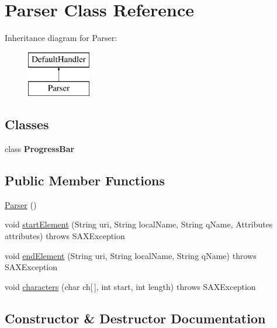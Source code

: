 \hypertarget{class_parser}{}\section{Parser Class Reference}
\label{class_parser}
Inheritance diagram for Parser\+:\begin{figure}[H]
\begin{center}
\leavevmode
\includegraphics[height=2.000000cm]{class_parser}
\end{center}
\end{figure}
\subsection*{Classes}
\begin{DoxyCompactItemize}
\item 
class {\bfseries Progress\+Bar}
\end{DoxyCompactItemize}
\subsection*{Public Member Functions}
\begin{DoxyCompactItemize}
\item 
\hyperlink{class_parser_a5b20dc7a1c7a26ce3cec6cc070839bd4}{Parser} ()
\item 
void \hyperlink{class_parser_a6ca2235d63e8d6ce30a4a7c3e2deb523}{start\+Element} (String uri, String local\+Name, String q\+Name, Attributes attributes)  throws S\+A\+X\+Exception 
\item 
void \hyperlink{class_parser_a6235e3c77c809f5012c95629345e0f2f}{end\+Element} (String uri, String local\+Name, String q\+Name)  throws S\+A\+X\+Exception 
\item 
void \hyperlink{class_parser_a47bcfb67533ee080c38771c5487edd90}{characters} (char ch\mbox{[}$\,$\mbox{]}, int start, int length)  throws S\+A\+X\+Exception 
\end{DoxyCompactItemize}


\subsection{Constructor \& Destructor Documentation}
\hypertarget{class_parser_a5b20dc7a1c7a26ce3cec6cc070839bd4}{}\label{class_parser_a5b20dc7a1c7a26ce3cec6cc070839bd4} 
